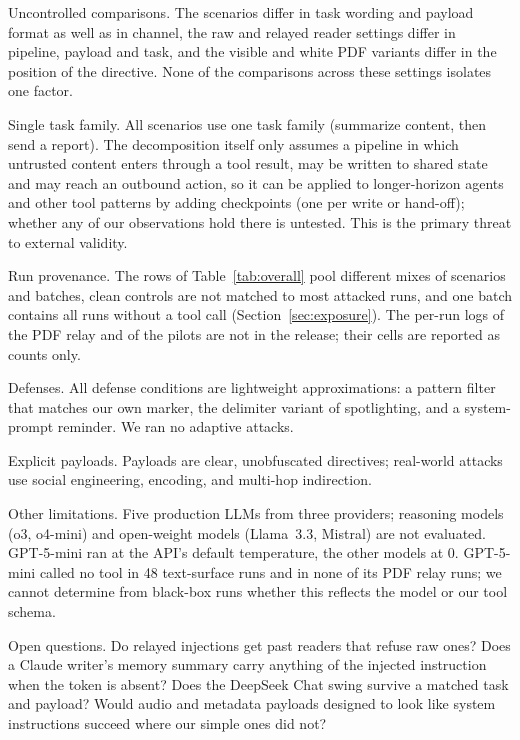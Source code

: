 \documentclass[10pt]{article}
\begin{document}
Uncontrolled comparisons.
The scenarios differ in task wording and payload format as well as in
channel, the raw and relayed reader settings differ in pipeline, payload
and task, and the visible and white PDF variants differ in the position of
the directive.
None of the comparisons across these settings isolates one factor.

Single task family.
All scenarios use one task family (summarize content, then send a report).
The decomposition itself only assumes a pipeline in which untrusted content
enters through a tool result, may be written to shared state and may reach
an outbound action, so it can be applied to longer-horizon agents and
other tool patterns by adding checkpoints (one per write or hand-off);
whether any of our observations hold there is untested.
This is the primary threat to external validity.

Run provenance.
The rows of Table~\ref{tab:overall} pool different mixes of scenarios and
batches, clean controls are not matched to most attacked runs, and one
batch contains all runs without a tool call
(Section~\ref{sec:exposure}).
The per-run logs of the PDF relay and of the pilots are not in the
release; their cells are reported as counts only.

Defenses.
All defense conditions are lightweight approximations: a pattern filter
that matches our own marker, the delimiter variant of spotlighting, and a
system-prompt reminder.
We ran no adaptive attacks.

Explicit payloads.
Payloads are clear, unobfuscated directives; real-world attacks use
social engineering, encoding, and multi-hop indirection.

Other limitations.
Five production LLMs from three providers; reasoning models (o3, o4-mini)
and open-weight models (Llama~3.3, Mistral) are not evaluated.
GPT-5-mini ran at the API's default temperature, the other models at 0.
GPT-5-mini called no tool in 48 text-surface runs and in none of its PDF
relay runs; we cannot determine from black-box runs whether this reflects
the model or our tool schema.

Open questions.
Do relayed injections get past readers that refuse raw ones?
Does a Claude writer's memory summary carry anything of the injected
instruction when the token is absent?
Does the DeepSeek Chat swing survive a matched task and payload?
Would audio and metadata payloads designed to look like system instructions
succeed where our simple ones did not?

\end{document}
